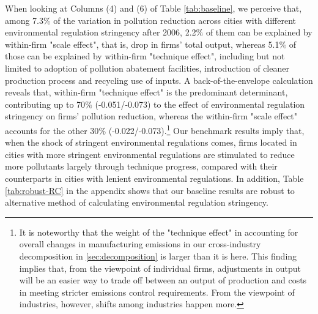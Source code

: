 \documentclass[12pt,english]{article}
\begin{document}
When looking at Columns (4) and (6) of Table \ref{tab:baseline}, we perceive that, among 7.3$\%$ of the variation in pollution reduction across cities with different environmental regulation stringency after 2006, 2.2$\%$ of them can be explained by within-firm "scale effect", that is, drop in firms' total output, whereas 5.1$\%$ of those can be explained by within-firm "technique effect", including but not limited to adoption of pollution abatement facilities, introduction of cleaner production process and recycling use of inputs. A back-of-the-envelope calculation reveals that, within-firm "technique effect" is the predominant determinant, contributing up to 70$\%$ (-0.051/-0.073) to the effect of environmental regulation stringency on firms' pollution reduction, whereas the within-firm "scale effect" accounts for the other 30$\%$ (-0.022/-0.073).\footnote{It is noteworthy that the weight of the "technique effect" in accounting for overall changes in manufacturing emissions in our cross-industry decomposition in \ref{sec:decomposition} is larger than it is here. This finding implies that, from the viewpoint of individual firms, adjustments in output will be an easier way to trade off between an output of production and costs in meeting stricter emissions control requirements. From the viewpoint of industries, however, shifts among industries happen more.} Our benchmark results imply that, when the shock of stringent environmental regulations comes, firms located in cities with more stringent environmental regulations are stimulated to reduce more pollutants largely through technique progress, compared with their counterparts in cities with lenient environmental regulations. In addition, Table \ref{tab:robust-RC} in the appendix shows that our baseline results are robust to alternative method of calculating environmental regulation stringency.

\end{document}
